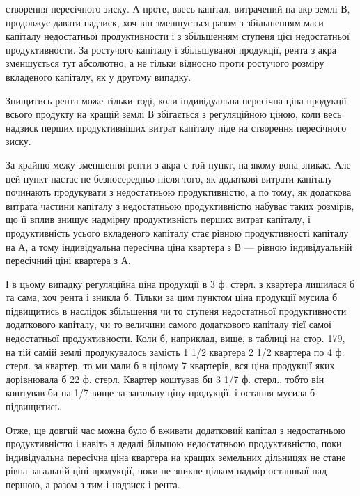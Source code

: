 \parcont{}  %
створення пересічного зиску. А проте, ввесь капітал, витрачений на акр землі В,
продовжує давати надзиск, хоч він зменшується разом з збільшенням маси капіталу
недостатньої продуктивности і з збільшенням ступеня цієї недостатньої
продуктивности. За ростучого капіталу і збільшуваної продукції, рента з акра
зменшується тут абсолютно, а не тільки відносно проти ростучого розміру вкладеного
капіталу, як у другому випадку.

Знищитись рента може тільки тоді, коли індивідуальна пересічна ціна
продукції всього продукту на кращій землі В збігається з регуляційною ціною,
коли весь надзиск перших продуктивніших витрат капіталу піде на створення
пересічного зиску.

За крайню межу зменшення ренти з акра є той пункт, на якому вона
зникає. Але цей пункт настає не безпосередньо після того, як додаткові витрати
капіталу починають продукувати з недостатньою продуктивністю, а по тому, як
додаткова витрата частини капіталу з недостатньою продуктивністю набуває таких
розмірів, що її вплив знищує надмірну продуктивність перших витрат капіталу,
і продуктивність усього вкладеного капіталу стає рівною продуктивності капіталу
на А, а тому індивідуальна пересічна ціна квартера з В — рівною індивідуальній
пересічний ціні квартера з А.

І в цьому випадку регуляційна ціна продукції в 3 ф. стерл. з квартера
лишилася б та сама, хоч рента і зникла б. Тільки за цим пунктом ціна продукції
мусила б підвищитись в наслідок збільшення чи то ступеня недостатньої
продуктивности додаткового капіталу, чи то величини самого додаткового
капіталу тієї самої недостатньої продуктивности. Коли б, наприклад, вище, в таблиці
на стор. 179, на тій самій землі продукувалось замість 1 1/2 квартера 2  1/2 квартера
по 4 ф. стерл. за квартер, то ми мали б в цілому 7 квартерів, вся ціна
продукції яких дорівнювала б 22 ф. стерл. Квартер коштував би 3 1/7 ф. стерл.,
тобто він коштував би на 1/7 вище за загальну ціну продукції, і остання
мусила б підвищитись.

Отже, ще довгий час можна було б вживати додатковий капітал з недостатньою
продуктивністю і навіть з дедалі більшою недостатньою продуктивністю,
поки індивідуальна пересічна ціна квартера на кращих земельних дільницях
не стане рівна загальній ціні продукції, поки не зникне цілком надмір останньої
над першою, а разом з тим і надзиск і рента.

